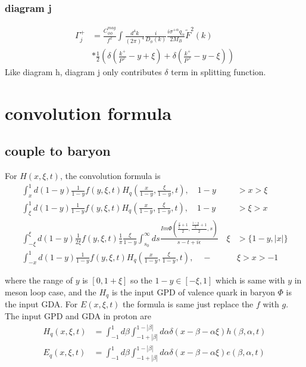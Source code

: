 \documentclass[preprintnumbers,prd,superscriptaddress,preprint]{revtex4-1}
\begin{document}
	\subsubsection{diagram j }
	
	\begin{align*}
		\Gamma_{j}^{+} & =\frac{C^{mag}_{\phi\phi}}{f^{2}}\int\frac{d^{4}k}{(2\pi)^{4}}\frac{i}{D_{\phi}(k)}\frac{i\sigma^{+\alpha}q_{\alpha}}{2M_{B}}\tilde{F}^{2}(k)\\
		& *\frac{1}{2}(\delta(\frac{k^{+}}{P^{+}}-y+\xi)+\delta(\frac{k^{+}}{P^{+}}-y-\xi))
	\end{align*}
	Like diagram h, diagram j only contributes $\delta$ term in splitting function.
	
	\section{convolution formula}
	
	\subsection{couple to baryon}
	
	For $H(x,\xi,t)$, the convolution formula is
	\begin{align*}
		\int_{x}^{1}d(1-y)\frac{1}{1-y}f(y,\xi,t)H_{q}(\frac{x}{1-y},\frac{\xi}{1-y},t),\quad1-y & >x>\xi\\
		\int_{\xi}^{1}d(1-y)\frac{1}{1-y}f(y,\xi,t)H_{q}(\frac{x}{1-y},\frac{\xi}{1-y},t),\quad1-y & >\xi>x\\
		\int_{-\xi}^{\xi}d(1-y)\frac{1}{2\xi}f(y,\xi,t)\frac{1}{\pi}\frac{\xi}{1-y}\int_{s_{0}}^{\infty}ds\frac{Im\Phi(\frac{\frac{x}{\xi}+1}{2},\frac{\frac{1-y}{\xi}+1}{2},s)}{s-t+i\epsilon}\quad\xi & >\{1-y,|x|\}\\
		\int_{-x}^{1}d(1-y)\frac{1}{1-y}f(y,\xi,t)H_{q}(\frac{x}{1-y},\frac{\xi}{1-y},t),\quad- & \xi>x>-1
	\end{align*}
	
	where the range of $y$ is $[0,1+\xi]$ so the $1-y\in[-\xi,1]$ which
	is same with $y$ in meson loop case, and the $H_{q}$ is the input
	GPD of valence quark in baryon $\Phi$ is the input GDA. For $E(x,\xi,t)$
	the formula is same just replace the $f$ with $g$. The input GPD
	and GDA in proton are 
	\begin{align*}
		H_{q}(x,\xi,t) & =\int_{-1}^{1}d\beta\int_{-1+|\beta|}^{1-|\beta|}d\alpha\delta(x-\beta-\alpha\xi)h(\beta,\alpha,t)\\
		E_{q}(x,\xi,t) & =\int_{-1}^{1}d\beta\int_{-1+|\beta|}^{1-|\beta|}d\alpha\delta(x-\beta-\alpha\xi)e(\beta,\alpha,t)
	\end{align*}
	
\end{document}
